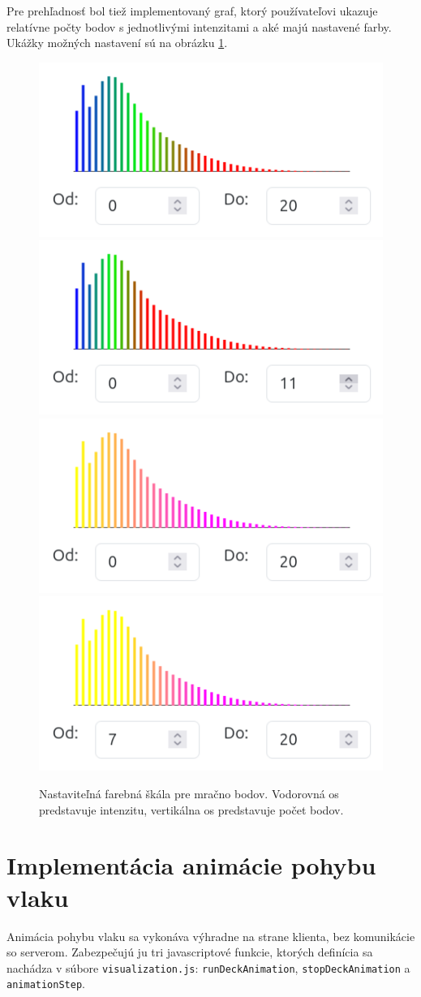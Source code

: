 Pre prehľadnosť bol tiež implementovaný graf, ktorý používateľovi ukazuje relatívne počty bodov s jednotlivými intenzitami a aké majú nastavené farby. Ukážky možných nastavení sú na obrázku \ref{fig:farebna_skala}.

\begin{figure}[h]
    \centering
    \includegraphics[width=0.35\linewidth]{text_prace/obrazky-figures/farebna_skala1.png}
    \includegraphics[width=0.35\linewidth]{text_prace/obrazky-figures/farebna_skala2.png}
    \includegraphics[width=0.35\linewidth]{text_prace/obrazky-figures/farebna_skala3.png}
    \includegraphics[width=0.35\linewidth]{text_prace/obrazky-figures/farebna_skala4.png}
    \caption{Nastaviteľná farebná škála pre mračno bodov. Vodorovná os predstavuje intenzitu, vertikálna os predstavuje počet bodov.}
    \label{fig:farebna_skala}
\end{figure}

\section{Implementácia animácie pohybu vlaku}
\label{sec:implementacia_animacie}

Animácia pohybu vlaku sa vykonáva výhradne na strane klienta, bez komunikácie so serverom. Zabezpečujú ju tri javascriptové funkcie, ktorých definícia sa nachádza v súbore \texttt{visualization.js}: \texttt{runDeckAnimation}, \texttt{stopDeckAnimation} a \texttt{animationStep}.

